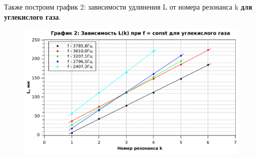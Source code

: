 \documentclass[11pt,a4paper,oneside]{article}
\begin{document}
\begin{enumerate}
\begin{figure}[h!]
\end{figure} 
\newpage
Также построим график 2: зависимости удлинения L от номера резонанса k \textbf{для углекислого газа}.
\begin{figure}[h!]
\centering
\includegraphics[scale=0.8]{Graph2.pdf}
\end{figure} 



\end{enumerate}
\end{document}
